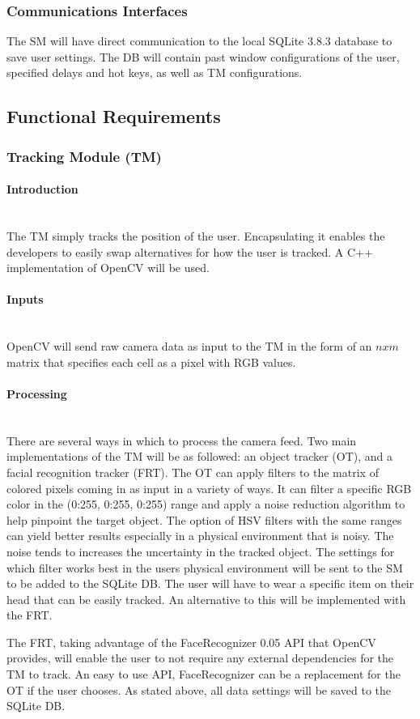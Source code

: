 \documentclass[titlepage]{article}
\newcommand{\myparagraph}[1]{\paragraph{#1}\mbox{}\\}
\begin{document}
\subsubsection{Communications Interfaces}
The SM will have direct communication to the local SQLite 3.8.3 database to save user settings. The DB will contain past window configurations of the user, specified delays and hot keys, as well as TM configurations.

\subsection{Functional Requirements}
\subsubsection{Tracking Module (TM)}

\myparagraph{Introduction}
The TM simply tracks the position of the user. Encapsulating it enables the developers to easily swap alternatives for how the user is tracked. A C++ implementation of OpenCV will be used.

\myparagraph{Inputs}
OpenCV will send raw camera data as input to the TM in the form of an $nxm$ matrix that specifies each cell as a pixel with RGB values.

\myparagraph{Processing}
There are several ways in which to process the camera feed. Two main implementations of the TM will be as followed: an object tracker (OT), and a facial recognition tracker (FRT). The OT can apply filters to the matrix of colored pixels coming in as input in a variety of ways. It can filter a specific RGB color in the (0:255, 0:255, 0:255) range and apply a noise reduction algorithm to help pinpoint the target object. The option of HSV filters with the same ranges can yield better results especially in a physical environment that is noisy. The noise tends to increases the uncertainty in the tracked object. The settings for which filter works best in the users physical environment will be sent to the SM to be added to the SQLite DB. The user will have to wear a specific item on their head that can be easily tracked. An alternative to this will be implemented with the FRT.

The FRT, taking advantage of the FaceRecognizer 0.05 API that OpenCV provides, will enable the user to not require any external dependencies for the TM to track. An easy to use API, FaceRecognizer can be a replacement for the OT if the user chooses.  As stated above, all data settings will be saved to the SQLite DB.
\end{document}
